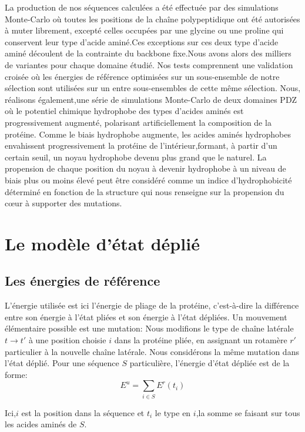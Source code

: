 La production de nos séquences calculées a été effectuée par des simulations Monte-Carlo où toutes les positions de la chaîne polypeptidique ont été autorisées à muter librement, excepté celles occupées par une glycine ou une proline qui conservent leur type d'acide aminé.Ces exceptions sur ces deux type d'acide aminé découlent de la contrainte du backbone fixe.Nous avons alors des milliers de variantes pour chaque domaine étudié. Nos tests comprennent une validation croisée où les énergies de référence optimisées sur un sous-ensemble de notre sélection sont utilisées sur un entre sous-ensembles de cette même sélection. Nous, réalisons également,une série de simulations Monte-Carlo de deux domaines PDZ où le potentiel chimique hydrophobe des types d'acides aminés est progressivement augmenté, polarisant artificiellement la composition de la protéine. Comme le biais hydrophobe augmente, les acides aminés hydrophobes envahissent progressivement la protéine de l'intérieur,formant, à partir d'un certain seuil, un noyau hydrophobe devenu plus grand que le naturel.
La propension de chaque position du noyau à devenir hydrophobe à un niveau de biais plus ou moins élevé peut être considéré comme un indice d'hydrophobicité déterminé en fonction de la structure qui nous renseigne sur la propension du cœur à supporter des mutations.

\section{Le modèle d'état déplié}
\subsection{Les énergies de référence}

L'énergie utilisée est ici l'énergie de pliage de la protéine, c'est-à-dire la différence entre
son énergie à l'état pliées et son énergie à l'état dépliées. Un mouvement élémentaire possible est une \og mutation\fg:
Nous modifions le type de chaîne latérale $t \rightarrow t'$ à une position choisie $i$ dans la protéine pliée, en assignant
un rotamère $r'$ particulier à la nouvelle chaîne latérale. Nous considérons la même mutation dans
l'état déplié. Pour une séquence $S$ particulière, l'énergie d'état dépliée est de la forme:
\begin{equation}
  E^u=\sum_{i\in S}E^r(t_i)
  \label{eq:unfolded}
\end{equation} 

Ici,$i$ est la position dans la séquence et $t_i$ le type en $i$,la somme se faisant sur tous les acides aminés de $S$.

